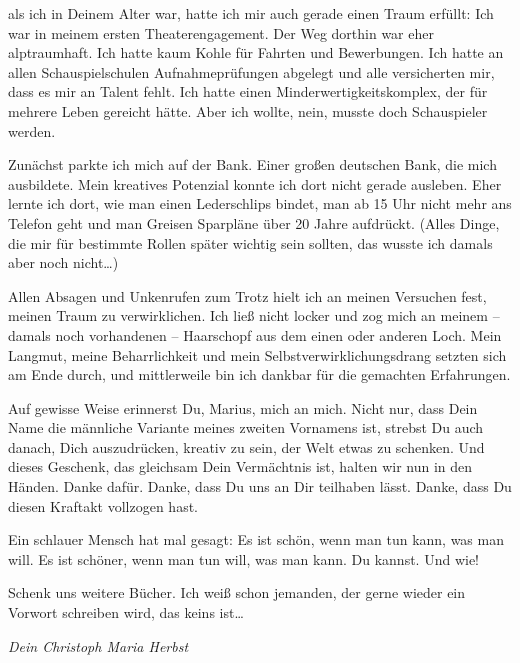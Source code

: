 \documentclass[fontsize=14pt,a4paper,headinclude,DIV=calc,automark]{scrbook}
\begin{document}
\noindent als ich in Deinem Alter war, hatte ich mir auch gerade einen Traum erfüllt: Ich war in meinem ersten Theaterengagement.
Der Weg dorthin war eher alptraumhaft. Ich hatte kaum Kohle für Fahrten und Bewerbungen. Ich hatte an allen Schauspielschulen Aufnahmeprüfungen abgelegt und alle versicherten mir, dass es mir an Talent fehlt. Ich hatte einen Minderwertigkeitskomplex, der für mehrere Leben gereicht hätte.
Aber ich wollte, nein, musste doch Schauspieler werden.

Zunächst parkte ich mich auf der Bank. Einer großen deutschen Bank, die mich ausbildete. Mein kreatives Potenzial konnte ich dort nicht gerade ausleben. Eher lernte ich dort, wie man einen Lederschlips bindet, man ab 15 Uhr nicht mehr ans Telefon geht und man Greisen Sparpläne über 20 Jahre aufdrückt. (Alles Dinge, die mir für bestimmte Rollen später wichtig sein sollten, das wusste ich damals aber noch nicht…)

Allen Absagen und Unkenrufen zum Trotz hielt ich an meinen Versuchen fest, meinen Traum zu verwirklichen.
Ich ließ nicht locker und zog mich an meinem – damals noch vorhandenen – Haarschopf aus dem einen oder anderen Loch. Mein Langmut, meine Beharrlichkeit und mein Selbstverwirklichungsdrang setzten sich am Ende durch, und mittlerweile bin ich dankbar für die gemachten Erfahrungen.

Auf gewisse Weise erinnerst Du, Marius, mich an mich. Nicht nur, dass Dein Name die männliche Variante meines zweiten Vornamens ist, strebst Du auch danach, Dich auszudrücken, kreativ zu sein, der Welt etwas zu schenken. Und dieses Geschenk, das gleichsam Dein Vermächtnis ist, halten wir nun in den Händen.
Danke dafür. Danke, dass Du uns an Dir teilhaben lässt. Danke, dass Du diesen Kraftakt vollzogen hast.

Ein schlauer Mensch hat mal gesagt: Es ist schön, wenn man tun kann, was man will. Es ist schöner, wenn man tun will, was man kann.
Du kannst. Und wie!

Schenk uns weitere Bücher. Ich weiß schon jemanden, der gerne wieder ein Vorwort schreiben wird, das keins ist…

\vspace{0.5cm}
\noindent\textit{Dein Christoph Maria Herbst}
\end{document}
